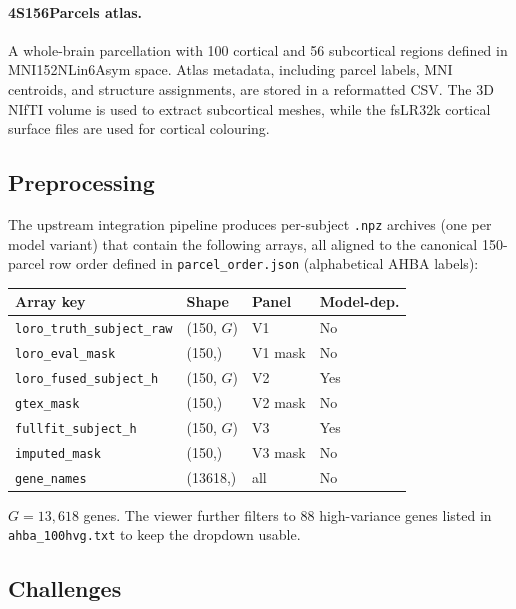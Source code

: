 \documentclass[11pt,letterpaper]{article}
\begin{document}
\paragraph{4S156Parcels atlas.}
A whole-brain parcellation with 100 cortical and 56 subcortical regions
defined in MNI152NLin6Asym space.
Atlas metadata, including parcel labels, MNI centroids, and structure
assignments, are stored in a reformatted CSV.
The 3D NIfTI volume is used to extract subcortical meshes, while the
fsLR32k cortical surface files are used for cortical colouring.

\subsection{Preprocessing}

The upstream integration pipeline produces per-subject \texttt{.npz} archives
(one per model variant) that contain the following arrays, all aligned to
the canonical 150-parcel row order defined in \texttt{parcel\_order.json}
(alphabetical AHBA labels):

\begin{center}
\begin{tabular}{llll}
\toprule
Array key & Shape & Panel & Model-dep.\\
\midrule
\texttt{loro\_truth\_subject\_raw} & (150, $G$) & V1 & No \\
\texttt{loro\_eval\_mask}         & (150,)     & V1 mask & No \\
\texttt{loro\_fused\_subject\_h}  & (150, $G$) & V2 & Yes \\
\texttt{gtex\_mask}               & (150,)     & V2 mask & No \\
\texttt{fullfit\_subject\_h}      & (150, $G$) & V3 & Yes \\
\texttt{imputed\_mask}            & (150,)     & V3 mask & No \\
\texttt{gene\_names}              & (13618,)   & all & No \\
\bottomrule
\end{tabular}
\end{center}

\noindent $G = 13{,}618$ genes.
The viewer further filters to 88 high-variance genes listed in
\texttt{ahba\_100hvg.txt} to keep the dropdown usable.

\subsection{Challenges}
\end{document}
